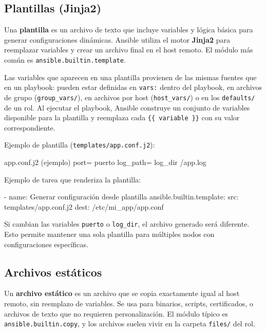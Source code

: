 \subsection{Plantillas (Jinja2)}
\label{subsec:ansible_templates_intro}

Una \textbf{plantilla} es un archivo de texto que incluye variables y lógica básica para generar configuraciones dinámicas. Ansible utiliza el motor \textbf{Jinja2} para reemplazar variables y crear un archivo final en el host remoto. El módulo más común es \texttt{ansible.builtin.template}.

Las variables que aparecen en una plantilla provienen de las mismas fuentes que en un playbook: pueden estar definidas en \texttt{vars:} dentro del playbook, en archivos de grupo (\texttt{group\_vars/}), en archivos por host (\texttt{host\_vars/}) o en los \texttt{defaults/} de un rol. Al ejecutar el playbook, Ansible construye un conjunto de variables disponible para la plantilla y reemplaza cada \texttt{\{\{ variable \}\}} con su valor correspondiente. \cite{ansible_variables}

Ejemplo de plantilla (\texttt{templates/app.conf.j2}):
\begin{codeblock}
app.conf.j2 (ejemplo)
port={{ puerto }}
log_path={{ log_dir }}/app.log
\end{codeblock}

Ejemplo de tarea que renderiza la plantilla:
\begin{yamlcode}
- name: Generar configuración desde plantilla
  ansible.builtin.template:
    src: templates/app.conf.j2
    dest: /etc/mi_app/app.conf
\end{yamlcode}

Si cambian las variables \texttt{puerto} o \texttt{log\_dir}, el archivo generado será diferente. Esto permite mantener una sola plantilla para múltiples nodos con configuraciones específicas.

\subsection{Archivos estáticos}
\label{subsec:ansible_static_files}

Un \textbf{archivo estático} es un archivo que se copia exactamente igual al host remoto, sin reemplazo de variables. Se usa para binarios, scripts, certificados, o archivos de texto que no requieren personalización. El módulo típico es \texttt{ansible.builtin.copy}, y los archivos suelen vivir en la carpeta \texttt{files/} del rol.


